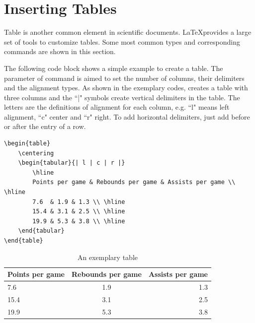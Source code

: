 \newpage
	
\section{Inserting Tables}

	Table is another common element in scientific documents. \LaTeX provides a large set of tools to customize tables. Some most common types and corresponding commands are shown in this section.
	
	The following code block shows a simple example to create a table. The parameter of command {\color{blue}{\verb|tabular|}} is aimed to set the number of columns, their delimiters and the alignment types. As shown in the exemplary codes, {} creates a table with three columns and the ``|" symbols create vertical delimiters in the table. The letters are the definitions of alignment for each column, e.g. ``l" means left alignment, ``c" center and ``r" right. To add horizontal delimiters, just add {\color{blue}{\verb|\hline|}} before or after the entry of a row. 
	
	\begin{minipage}{\linewidth}
		\begin{lstlisting}
\begin{table}
	\centering
	\begin{tabular}{| l | c | r |}
		\hline
		Points per game & Rebounds per game & Assists per game \\ \hline
		7.6  & 1.9 & 1.3 \\ \hline
		15.4 & 3.1 & 2.5 \\ \hline
		19.9 & 5.3 & 3.8 \\ \hline
	\end{tabular}
\end{table}
		\end{lstlisting}
	\end{minipage}

	
	\begin{table}[h!]
		\centering
		\begin{tabular}{| l | c | r |}
			\hline
			Points per game & Rebounds per game & Assists per game \\ \hline
			7.6  & 1.9 & 1.3 \\ \hline
			15.4 & 3.1 & 2.5 \\ \hline
			19.9 & 5.3 & 3.8 \\ \hline
		\end{tabular}
		\caption{An exemplary table}
		\label{table_1}
	\end{table}
	
